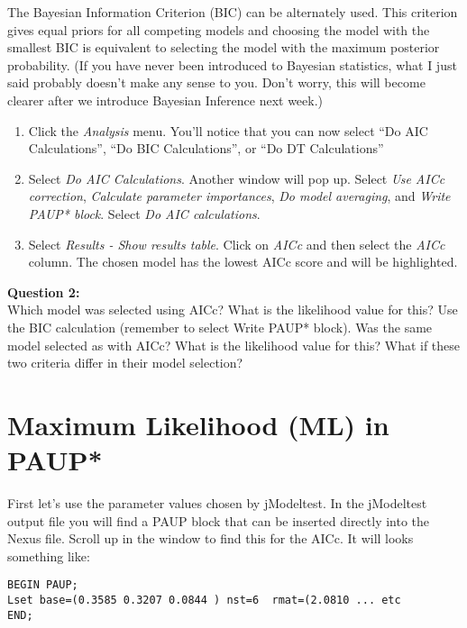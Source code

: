 \documentclass[11pt]{article}
\begin{document}
The Bayesian Information Criterion (BIC) can be alternately used.  
This criterion gives equal priors for all competing models and choosing the model with the smallest 
BIC is equivalent to selecting the model with the maximum posterior probability. 
(If you have never been introduced to Bayesian statistics, what I just said probably doesn’t make any sense to you.  
Don’t worry, this will become clearer after we introduce Bayesian Inference next week.)

\begin{enumerate}

\item Click the \textit{Analysis} menu.  You’ll notice that you can now select ``Do AIC Calculations'', ``Do BIC Calculations'', or ``Do DT Calculations''

\item Select \textit{Do AIC Calculations}.  Another window will pop up.  Select \textit{Use AICc correction}, \textit{Calculate parameter importances}, 
        \textit{Do model averaging}, and \textit{Write PAUP* block}.  Select \textit{Do AIC calculations}.
\item Select \textit{Results - Show results table}.  Click on \textit{AICc} and then select the \textit{AICc} column.  
The chosen model has the lowest AICc score and will be highlighted.

\end{enumerate}


\begin{framed}
\noindent
\textbf{Question 2:} \\
Which model was selected using AICc?  What is the likelihood value for this?  Use the BIC calculation (remember to select Write PAUP* block).  Was the same model selected as with AICc?  What is the likelihood value for this? What if these two criteria differ in their model selection?  
\end{framed}

\section{Maximum Likelihood (ML) in PAUP*}

First let's use the parameter values chosen by jModeltest.
In the jModeltest output file you will find a PAUP block that can be inserted directly into the Nexus file.  
Scroll up in the window to find this for the AICc.  
It will looks something like:

\begin{verbatim}
BEGIN PAUP;
Lset base=(0.3585 0.3207 0.0844 ) nst=6  rmat=(2.0810 ... etc
END;
\end{verbatim}
\end{document}
